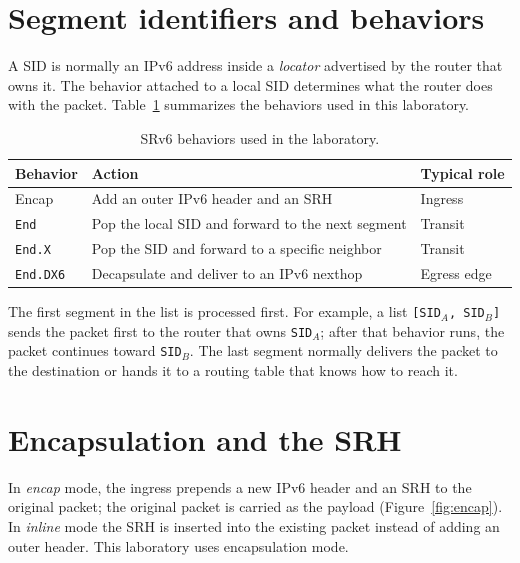 \documentclass[11pt,letterpaper]{report}
\newcommand{\code}[1]{\texttt{#1}}
\begin{document}
\section{Segment identifiers and behaviors}

A SID is normally an IPv6 address inside a \emph{locator} advertised by the
router that owns it.  The behavior attached to a local SID determines what the
router does with the packet.  Table~\ref{tab:behaviors} summarizes the
behaviors used in this laboratory.

\begin{table}[htbp]
  \centering
  \caption{SRv6 behaviors used in the laboratory.}
  \label{tab:behaviors}
  \begin{tabular}{@{}lll@{}}
    \toprule
    Behavior & Action & Typical role \\
    \midrule
    Encap        & Add an outer IPv6 header and an SRH              & Ingress \\
    \texttt{End} & Pop the local SID and forward to the next segment & Transit \\
    \texttt{End.X} & Pop the SID and forward to a specific neighbor  & Transit \\
    \texttt{End.DX6} & Decapsulate and deliver to an IPv6 nexthop  & Egress edge \\
    \bottomrule
  \end{tabular}
\end{table}

The first segment in the list is processed first.  For example, a list
\code{[SID$_A$, SID$_B$]} sends the packet first to the router that owns
\code{SID$_A$}; after that behavior runs, the packet continues toward
\code{SID$_B$}.  The last segment normally delivers the packet to the
destination or hands it to a routing table that knows how to reach it.

\section{Encapsulation and the SRH}

In \emph{encap} mode, the ingress prepends a new IPv6 header and an SRH to the
original packet; the original packet is carried as the payload
(Figure~\ref{fig:encap}).  In \emph{inline} mode the SRH is inserted into the
existing packet instead of adding an outer header.  This laboratory uses
encapsulation mode.
\end{document}
